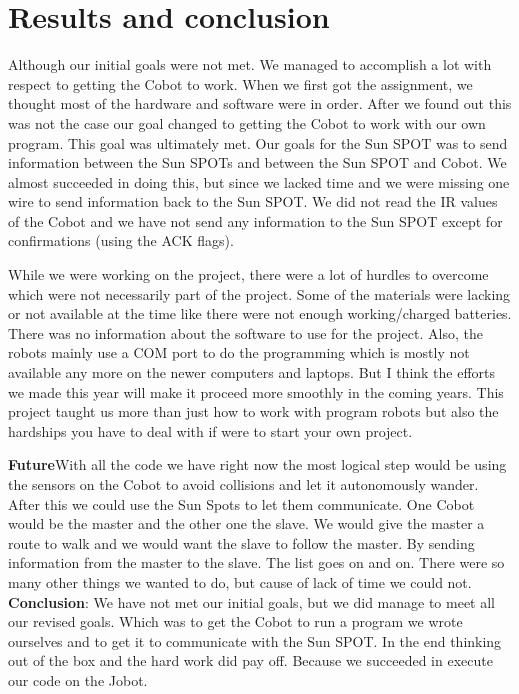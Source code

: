 \documentclass[a4paper,10pt]{article} %
\begin{document}

\section{Results and conclusion} %

Although our initial goals were not met. We managed to accomplish a lot with
respect to getting the Cobot to work. When we first got the assignment, we
thought most of the hardware and software were in order. After we found out this
was not the case our goal changed to getting the Cobot to work with our own
program. This goal was ultimately met. Our goals for the Sun SPOT was to send
information between the Sun SPOTs and between the Sun SPOT and Cobot. We almost
succeeded in doing this, but since we lacked time and we were missing one wire
to send information back to the Sun SPOT. We did not read the IR values of the
Cobot and we have not send any information to the Sun SPOT except for
confirmations (using the ACK flags).

While we were working on the project, there were a lot of hurdles to overcome
which were not necessarily part of the project. Some of the materials were
lacking or not available at the time like there were not enough working/charged
batteries. There was no information about the software to use for the project.
Also, the robots mainly use a COM port to do the programming which is mostly not
available any more on the newer computers and laptops. But I think the efforts
we made this year will make it proceed more smoothly in the coming years. This
project taught us more than just how to work with program robots but also the
hardships you have to deal with if were to start your own project. 

\noindent \textbf{Future}With all the code we have right now the most logical
step would be using the sensors on the Cobot to avoid collisions and let it
 autonomously wander.  After this we could use the Sun Spots to let them
communicate. One Cobot would be the master and the other one the
slave. We would give the master a route to walk and we would want the slave to
follow the master.  By sending information from the master to the slave. The list goes on and on. There were so many other things we wanted to do, but
 cause of lack of time we could not. \\

\noindent \textbf{Conclusion}: We have not met our initial goals, but we did
manage to meet all our revised goals. Which was to get the Cobot to run a
program we wrote ourselves and to get it to communicate with the Sun SPOT.
In the end thinking out of the box and the hard work did pay off. Because we succeeded
in execute our code on the Jobot.
\end{document}
